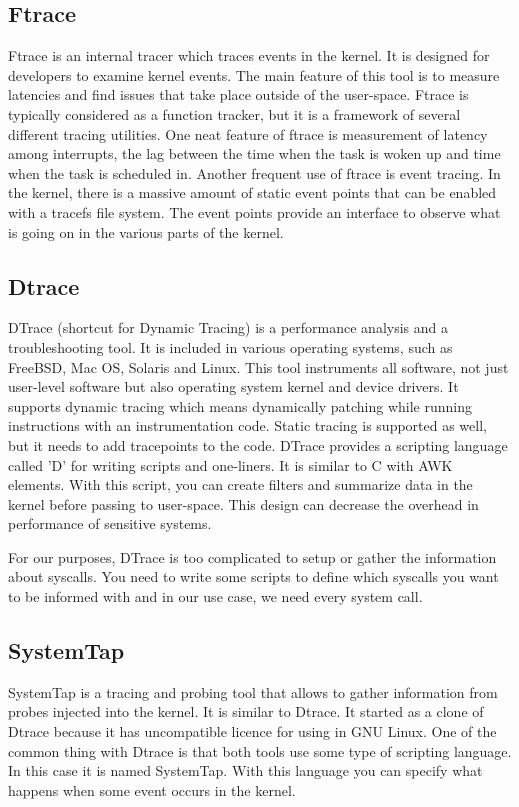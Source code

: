 \subsection{Ftrace}
Ftrace \cite{ftrace_man} is an internal tracer which traces events in the kernel.
It is designed for developers to examine kernel events.
The main feature of this tool is to measure latencies and find issues that take place outside of the user-space.
Ftrace is typically considered as a function tracker,
but it is a framework of several different tracing utilities.
One neat feature of ftrace is measurement of latency among interrupts, the lag between the time when the task is woken up and time when the task is scheduled in.
Another frequent use of ftrace is event tracing.
In the kernel, there is a massive amount of static event points that can be enabled with a tracefs file system.
The event points provide an interface to observe what is going on in the various parts of the kernel.

\subsection{Dtrace}
DTrace \cite{dtrace_man, dtrace_about} (shortcut for Dynamic Tracing) is a performance analysis and a troubleshooting tool.
It is included in various operating systems, such as FreeBSD, Mac OS, Solaris and Linux.
This tool instruments all software, not just user-level software but also operating system kernel and device drivers.
It supports dynamic tracing which means dynamically patching while running instructions with an instrumentation code.
Static tracing is supported as well, but it needs to add tracepoints to the code.
DTrace provides a scripting language called 'D' for writing scripts and one-liners.
It is similar to C with AWK elements.
With this script, you can create filters and summarize data in the kernel before passing to user-space.
This design can decrease the overhead in performance of  sensitive systems.

For our purposes, DTrace is too complicated to setup or gather the information about syscalls.
You need to write some scripts to define which syscalls you want to be informed with and in our use case, we need every system call.

\subsection{SystemTap}
SystemTap \cite{systemtap} is a tracing and probing tool that allows to gather information from probes injected into the kernel.
It is similar to Dtrace.
It started as a clone of Dtrace because it has uncompatible licence for using in GNU Linux.
One of the common thing with Dtrace is that both tools use some type of scripting language.
In this case it is named SystemTap.
With this language you can specify what happens when some event occurs in the kernel.

